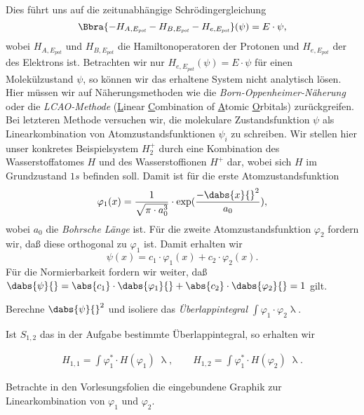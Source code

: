 \documentclass{subfiles}
\begin{document}
        Dies führt uns auf die zeitunabhängige Schrödingergleichung
        \[
            \Bbra{-H_{A,E_\textit{pot}} - H_{B,E_\textit{pot}} - H_{e,E_\textit{pot}}}(\psi) = E\cdot\psi,
        \]
        wobei $H_{A,E_\textit{pot}}$ und $H_{B,E_\textit{pot}}$ die Hamiltonoperatoren der Protonen und $H_{e,E_\textit{pot}}$ der des Elektrons ist. Betrachten wir nur $H_{e,E_\textit{pot}}(\psi) = E\cdot\psi$ für einen Molekülzustand $\psi$, so können wir das erhaltene System nicht analytisch lösen. Hier müssen wir auf Näherungsmethoden wie die \emph{Born-Oppenheimer-Näherung} oder die \emph{LCAO-Methode} (\underline{L}inear \underline{C}ombination of \underline{A}tomic \underline{O}rbitals) zurückgreifen. Bei letzteren Methode versuchen wir, die molekulare Zustandsfunktion $\psi$ als Linearkombination von Atomzustandsfunktionen $\psi_i$ zu schreiben. Wir stellen hier unser konkretes Beispielsystem $H_2^+$ durch eine Kombination des Wasserstoffatomes $H$ und des Wasserstoffionen $H^+$ dar, wobei sich $H$ im Grundzustand $1s$ befinden soll. Damit ist für die erste Atomzustandsfunktion 
        \[
            \varphi_1(x) = \frac{1}{\sqrt{\pi\cdot a_0^3}}\cdot \exp(\frac{-\dabs{x}{}^2}{a_0}),
        \]
        wobei $a_0$ die \emph{Bohrsche Länge} ist. Für die zweite Atomzustandsfunktion $\varphi_2$ fordern wir, daß diese orthogonal zu $\varphi_1$ ist. Damit erhalten wir
        \[
            \psi(x) = c_1\cdot\varphi_1(x) + c_2\cdot\varphi_2(x).
        \]
        Für die Normierbarkeit fordern wir weiter, daß $\dabs{\psi}{} = \abs{c_1}\cdot\dabs{\varphi_1}{} + \abs{c_2}\cdot\dabs{\varphi_2}{} = 1$ gilt. 
        \begin{Aufgabe}
            \nr{} Berechne $\dabs{\psi}{}^2$ und isoliere das \emph{Überlappintegral} $\int \varphi_1\cdot\varphi_2\uplambda$. 
        \end{Aufgabe}
        Ist $S_{1,2}$ das in der Aufgabe bestimmte Überlappintegral, so erhalten wir 

        \begin{align*}
            H_{1,1} = \int\varphi_1^*\cdot H(\varphi_1)\;\uplambda,\qquad H_{1,2} = \int\varphi_1^*\cdot H(\varphi_2)\;\uplambda.
        \end{align*}
        \begin{Aufgabe}
            \nr{} Betrachte in den Vorlesungsfolien die eingebundene Graphik zur Linearkombination von $\varphi_1$ und $\varphi_2$. 
        \end{Aufgabe}
\end{document}
